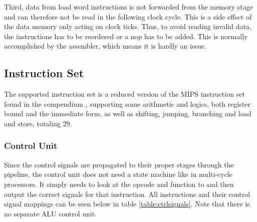 Third, data from load word instructions is not forwarded from the memory stage and can therefore not be read in the following clock cycle.
This is a side effect of the data memory only acting on clock ticks.
Thus, to avoid reading invalid data, the instructions has to be reordered or a nop has to be added. This is normally accomplished by the assembler, which means it is hardly an issue.

\subsection{Instruction Set}

The supported instruction set is a reduced version of the MIPS instruction set found in the compendium \cite[p.112]{lab-compendium},
supporting some arithmetic and logics,
both register bound and the immediate form,
as well as shifting, jumping, branching and load and store, totaling 29.

\subsubsection*{Control Unit}

Since the control signals are propagated to their proper stages through the pipeline, the control unit does not need a state machine like in multi-cycle processors.
It simply needs to look at the opcode and function to and then output the correct signals for that instruction.
All instructions and their control signal mappings can be seen below in table \ref{table:ctrlsignals}.
Note that there is no separate ALU control unit.

